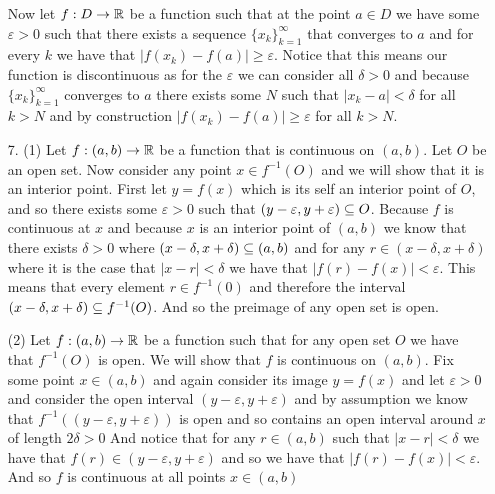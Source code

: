 \documentclass[12pt]{amsart}
\begin{document}
\begin{itemize}
        Now let $f:D\rightarrow\mathbb{R}$ be a function such that at the point $a\in D$ we have some
        $\varepsilon>0$ such that there exists a sequence $\{x_k\}_{k=1}^\infty$ that
        converges to $a$ and for every $k$ we have that $|f(x_k)-f(a)|\geq
            \varepsilon$. Notice that this means our function is discontinuous as for the
        $\varepsilon$ we can consider all $\delta>0$ and because $\{x_k\}_{k=1}^\infty$
        converges to $a$ there exists some $N$ such that $|x_k-a|<\delta$ for all $k>N$
        and by construction $|f(x_k)-f(a)|\geq \varepsilon$ for all $k>N$.

    \item[7.] (1) Let $f:(a,b)\rightarrow\mathbb{R}$ be a function that is continuous on $(a,b)$.
        Let $O$ be an open set. Now consider any point $x\in f^{-1}(O)$ and we will
        show that it is an interior point. First let $y=f(x)$ which is its self an
        interior point of $O$, and so there exists some $\varepsilon>0$ such that
        $(y-\varepsilon, y+\varepsilon)\subseteq O$. Because $f$ is continuous at $x$ and
        because $x$ is an interior point of $(a,b)$ we know that there exists
        $\delta>0$ where $(x-\delta,x+\delta)\subseteq (a,b)$ and for any $r\in
            (x-\delta,x+\delta)$ where it is the case that $|x-r|<\delta$ we have that
        $|f(r)-f(x)|<\varepsilon$. This means that every element $r\in f^{-1}(0)$ and
        therefore the interval $(x-\delta,x+\delta)\subseteq f^{-1}(O)$. And so the preimage
        of any open set is open.

        (2) Let $f:(a,b)\rightarrow\mathbb{R}$ be a function such that for any open set $O$ we have that $f^{-1}(O)$ is open.
        We will show that $f$ is continuous on $(a,b)$. Fix some point $x\in (a,b)$ and again consider its image $y=f(x)$ and let
        $\varepsilon>0$ and consider the open interval $(y-\varepsilon, y+\varepsilon)$ and by assumption we know that
        $f^{-1}((y-\varepsilon, y+\varepsilon))$ is open and so contains an open interval around $x$ of length $2\delta>0$
        And notice that for any $r\in (a,b)$ such that $|x-r|<\delta$ we have that $f(r)\in(y-\varepsilon, y+\varepsilon)$ and so
        we have that $|f(r)-f(x)|<\varepsilon$. And so $f$ is continuous at all points $x\in(a,b)$


\end{itemize}
\end{document}
